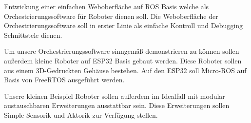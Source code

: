 \begin{flushleft}
    Entwickung einer einfachen Weboberfläche auf ROS Basis welche als
    Orchestrierungssoftware für Roboter dienen soll.
    Die Weboberfläche der Orchestrierungssoftware soll in erster Linie als einfache Kontroll und Debugging Schnittstele dienen.
    
    Um unsere Orchestrierungssoftware sinngemäß demonstrieren zu können sollen außerdem kleine Roboter auf
    ESP32 Basis gebaut werden. Diese Roboter sollen aus einem 3D-Gedruckten Gehäuse bestehen.
    Auf den ESP32 soll Micro-ROS auf Basis von FreeRTOS ausgeführt werden.

    Unsere kleinen Beispiel Roboter sollen außerdem im Idealfall mit modular austauschbaren Erweiterungen ausstattbar sein.
    Diese Erweiterungen sollen Simple Sensorik und Aktorik zur Verfügung stellen.
\end{flushleft}